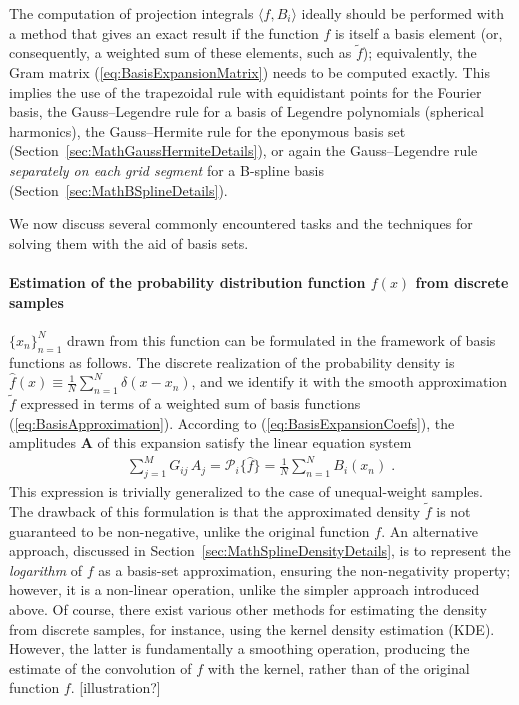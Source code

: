 \documentclass[12pt]{article}
\let\oldparagraph\paragraph
\renewcommand{\paragraph}[1]{\vspace{-2mm}\oldparagraph{#1}}
\begin{document}
The computation of projection integrals $\langle f, B_i\rangle$ ideally should be performed with a method that gives an exact result if the function $f$ is itself a basis element (or, consequently, a weighted sum of these elements, such as $\tilde f$); equivalently, the Gram matrix (\ref{eq:BasisExpansionMatrix}) needs to be computed exactly. This implies the use of the trapezoidal rule with equidistant points for the Fourier basis, the Gauss--Legendre rule for a basis of Legendre polynomials (spherical harmonics), the Gauss--Hermite rule for the eponymous basis set  (Section~\ref{sec:MathGaussHermiteDetails}), or again the Gauss--Legendre rule \textit{separately on each grid segment} for a B-spline basis (Section~\ref{sec:MathBSplineDetails}).

We now discuss several commonly encountered tasks and the techniques for solving them with the aid of basis sets.

\paragraph{Estimation of the probability distribution function $f(x)$ from discrete samples} $\{x_n\}_{n=1}^{N}$ drawn from this function can be formulated in the framework of basis functions as follows. The discrete realization of the probability density is $\hat f(x) \equiv \frac{1}{N} \sum_{n=1}^{N} \delta(x-x_n)$, and we identify it with the smooth approximation $\tilde f$ expressed in terms of a weighted sum of basis functions (\ref{eq:BasisApproximation}). According to (\ref{eq:BasisExpansionCoefs}), the amplitudes $\boldsymbol A$ of this expansion satisfy the linear equation system
\begin{align}
\sum_{j=1}^M G_{ij}\, A_j = \mathcal{P}_i \{\hat f\} = \frac{1}{N} \sum_{n=1}^{N} B_i(x_n) \;.
\end{align}
This expression is trivially generalized to the case of unequal-weight samples.\\
The drawback of this formulation is that the approximated density $\tilde f$ is not guaranteed to be non-negative, unlike the original function $f$. An alternative approach, discussed in Section~\ref{sec:MathSplineDensityDetails}, is to represent the \textit{logarithm} of $f$ as a basis-set approximation, ensuring the non-negativity property; however, it is a non-linear operation, unlike the simpler approach introduced above. Of course, there exist various other methods for estimating the density from discrete samples, for instance, using the kernel density estimation (KDE). However, the latter is fundamentally a smoothing operation, producing the estimate of the convolution of $f$ with the kernel, rather than of the original function $f$. [illustration?]
\end{document}
